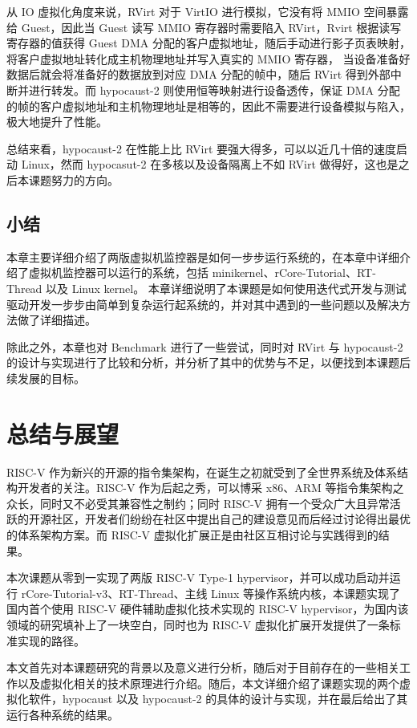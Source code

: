 从 IO 虚拟化角度来说，RVirt 对于 VirtIO 进行模拟，它没有将 MMIO 空间暴露给 Guest，因此当 Guest 读写 MMIO 寄存器时需要陷入 RVirt，Rvirt 根据读写寄存器的值获得 Guest DMA 分配的客户虚拟地址，随后手动进行影子页表映射，将客户虚拟地址转化成主机物理地址并写入真实的 MMIO 寄存器，
当设备准备好数据后就会将准备好的数据放到对应 DMA 分配的帧中，随后 RVirt 得到外部中断并进行转发。而 hypocaust-2 则使用恒等映射进行设备透传，保证 DMA 分配的帧的客户虚拟地址和主机物理地址是相等的，因此不需要进行设备模拟与陷入，极大地提升了性能。

总结来看，hypocaust-2 在性能上比 RVirt 要强大得多，可以以近几十倍的速度启动 Linux，然而 hypocasut-2 在多核以及设备隔离上不如 RVirt 做得好，这也是之后本课题努力的方向。





\section{小结}

本章主要详细介绍了两版虚拟机监控器是如何一步步运行系统的，在本章中详细介绍了虚拟机监控器可以运行的系统，包括 minikernel、rCore-Tutorial、RT-Thread 以及 Linux kernel。
本章详细说明了本课题是如何使用迭代式开发与测试驱动开发一步步由简单到复杂运行起系统的，并对其中遇到的一些问题以及解决方法做了详细描述。

除此之外，本章也对 Benchmark 进行了一些尝试，同时对 RVirt 与 hypocaust-2 的设计与实现进行了比较和分析，并分析了其中的优势与不足，以便找到本课题后续发展的目标。

\chapter{总结与展望}

RISC-V 作为新兴的开源的指令集架构，在诞生之初就受到了全世界系统及体系结构开发者的关注。RISC-V 作为后起之秀，可以博采 x86、ARM 等指令集架构之众长，同时又不必受其兼容性之制约；同时 RISC-V 拥有一个受众广大且异常活跃的开源社区，开发者们纷纷在社区中提出自己的建设意见而后经过讨论得出最优的体系架构方案。而 RISC-V 虚拟化扩展正是由社区互相讨论与实践得到的结果。

本次课题从零到一实现了两版 RISC-V Type-1 hypervisor，并可以成功启动并运行 rCore-Tutorial-v3、RT-Thread、主线 Linux 等操作系统内核，本课题实现了国内首个使用 RISC-V 硬件辅助虚拟化技术实现的 RISC-V hypervisor，为国内该领域的研究填补上了一块空白，同时也为 RISC-V 虚拟化扩展开发提供了一条标准实现的路径。

本文首先对本课题研究的背景以及意义进行分析，随后对于目前存在的一些相关工作以及虚拟化相关的技术原理进行介绍。随后，本文详细介绍了课题实现的两个虚拟化软件，hypocaust 以及 hypocaust-2 的具体的设计与实现，并在最后给出了其运行各种系统的结果。

